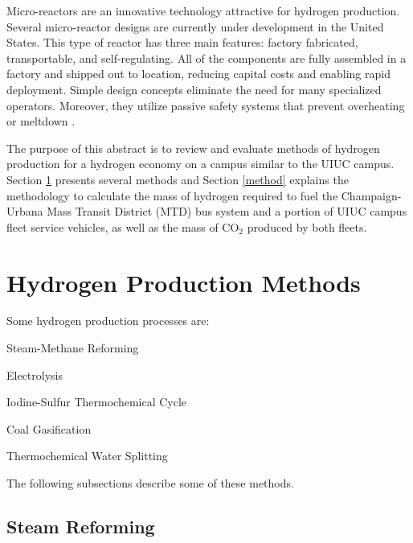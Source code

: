 \documentclass{anstrans}
\begin{document}
Micro-reactors are an innovative technology attractive for hydrogen production. Several micro-reactor designs are currently under development in the United States. This type of reactor has three main features: factory fabricated, transportable, and self-regulating. All of the components are fully assembled in a factory and shipped out to location, reducing capital costs and enabling rapid deployment. Simple design concepts eliminate the need for many specialized operators. Moreover, they utilize passive safety systems that prevent overheating or meltdown \cite{us-doe_ultimate_2019}.

The purpose of this abstract is to review and evaluate methods of hydrogen production for a hydrogen economy on a campus similar to the UIUC campus.
Section \ref{section:hydroprod} presents several methods and Section \ref{method} explains the methodology to calculate the mass of hydrogen required to fuel the Champaign-Urbana Mass Transit District (MTD) bus system and a portion of UIUC campus fleet service vehicles, as well as the mass of CO$_2$ produced by both fleets.

\section{Hydrogen Production Methods}
\label{section:hydroprod}

Some hydrogen production processes are: 
\begin{description}[font=$\bullet$\scshape\bfseries]
	\item[] Steam-Methane Reforming \cite{doe_office_of_energy_efficiency_and_renewable_energy_hydrogen_2020}
	\item[] Electrolysis \cite{doe_office_of_energy_efficiency_and_renewable_energy_hydrogen_2020}
	\item[] Iodine-Sulfur Thermochemical Cycle \cite{cea_gas-cooled_2006}
	\item[] Coal Gasification \cite{office_of_energy_efficiency_and_renewable_energy_coal_gas_2020}
	\item[] Thermochemical Water Splitting \cite{office_of_energy_efficiency_and_renewable_energy_thermo_water_2020}
\end{description}

The following subsections describe some of these methods.

\subsection{Steam Reforming}
\end{document}
